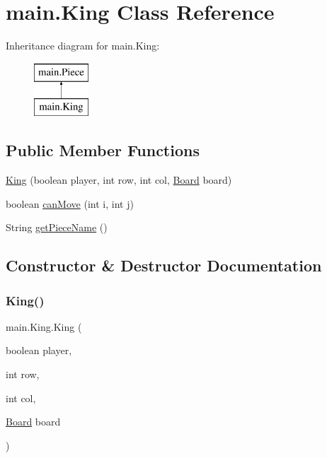 \hypertarget{classmain_1_1_king}{}\section{main.\+King Class Reference}
\label{classmain_1_1_king}
Inheritance diagram for main.\+King\+:\begin{figure}[H]
\begin{center}
\leavevmode
\includegraphics[height=2.000000cm]{classmain_1_1_king}
\end{center}
\end{figure}
\subsection*{Public Member Functions}
\begin{DoxyCompactItemize}
\item 
\mbox{\hyperlink{classmain_1_1_king_a4799054b9f4d081eb02b50f7dfdd68c2}{King}} (boolean player, int row, int col, \mbox{\hyperlink{classmain_1_1_board}{Board}} board)
\item 
boolean \mbox{\hyperlink{classmain_1_1_king_ad621a9ca71643c5542f024012c1771de}{can\+Move}} (int i, int j)
\item 
String \mbox{\hyperlink{classmain_1_1_king_a22461ffc069a468a22defbf83eb64ca5}{get\+Piece\+Name}} ()
\end{DoxyCompactItemize}


\subsection{Constructor \& Destructor Documentation}
\mbox{\label{classmain_1_1_king_a4799054b9f4d081eb02b50f7dfdd68c2}} 
\subsubsection{\texorpdfstring{King()}{King()}}
{\footnotesize\ttfamily main.\+King.\+King (\begin{DoxyParamCaption}\item[{boolean}]{player,  }\item[{int}]{row,  }\item[{int}]{col,  }\item[{\mbox{\hyperlink{classmain_1_1_board}{Board}}}]{board }\end{DoxyParamCaption})\hspace{0.3cm}{\ttfamily [inline]}}


